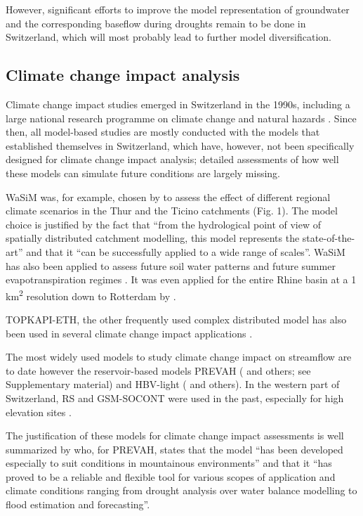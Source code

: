 \documentclass[10pt,a4paper]{article}
\begin{document}
However, significant efforts to improve the model representation of
groundwater and the corresponding baseflow during droughts remain to be
done in Switzerland, which will most probably lead to further model
diversification.

\subsection{Climate change impact analysis}
\label{sec:application:climatechange}

Climate change impact studies emerged in Switzerland in the 1990s,
including a large national research programme on climate change and
natural hazards \citep{snfs}. Since then, all model-based studies
are mostly conducted with the models that established themselves in
Switzerland, which have, however, not been specifically designed for
climate change impact analysis; detailed assessments of how well these
models can simulate future conditions are largely missing.

WaSiM was, for example, chosen by \citet{Jasper2004} to assess the
effect of different regional climate scenarios in the Thur and the
Ticino catchments (Fig. 1). The model choice is justified by the fact
that ``from the hydrological point of view of spatially distributed
catchment modelling, this model represents the state-of-the-art'' and
that it ``can be successfully applied to a wide range of scales''. 
WaSiM has also been applied to assess future soil water
patterns \citep{Jasper2006,Rossler2012} and future summer evapotranspiration
regimes \citep{Calanca2006}. It was even applied for the entire Rhine
basin at a 1 km\textsuperscript{2} resolution down to Rotterdam
by \citet{Kleinn_2005}.

TOPKAPI-ETH, the other frequently used complex distributed model has
also been used in several climate change impact
applications \citep{Fatichi2014,Fatichi2015,Finger_2012,Anghileri2018}. 

{The most widely used models to study climate change impact on
streamflow are to date however the reservoir-based models PREVAH
(}\citealt{Koplin2012,Bosshard2013a,Speich_2015,Junker_2014} and others; 
see Supplementary material) and HBV-light (\citealt{Etter2017,Hakala2020,Brunner_2018,Jenicek2018} 
and others). In the western part of
Switzerland, RS and GSM-SOCONT were used in the past, especially for
high elevation sites \citep{Horton2006,Uhlmann_2012,Uhlmann2013a,Terrier2015}.

The justification of these models for climate change impact assessments
is well summarized by \citet{K_plin_2010} who, for PREVAH, states that
the model ``has been developed especially to suit conditions in
mountainous environments'' and that it ``has proved to be a reliable and
flexible tool for various scopes of application and climate conditions
ranging from drought analysis over water balance modelling to flood
estimation and forecasting''. 
\end{document}
